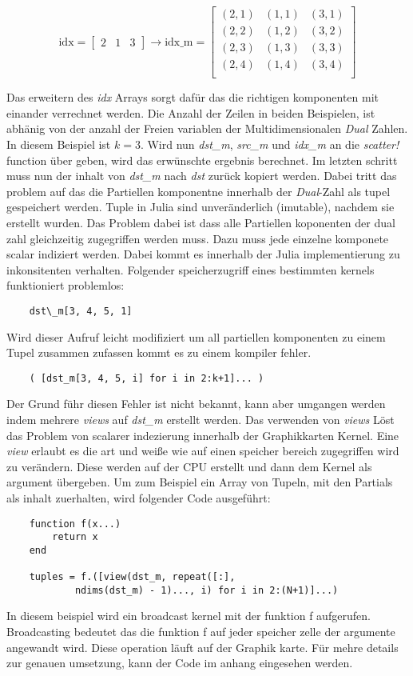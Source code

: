 \begin{equation}
\text{idx}= 
\begin{bmatrix}
 2 & 1 & 3
\end{bmatrix}
\rightarrow
\text{idx\_m} = 
\begin{bmatrix}
 (2, 1) & (1, 1) & (3, 1) \\ 
 (2, 2) & (1, 2) & (3, 2) \\
 (2, 3) & (1, 3) & (3, 3) \\
 (2, 4) & (1, 4) & (3, 4) \\
\end{bmatrix}
\end{equation}

Das erweitern des \textit{idx} Arrays sorgt dafür das die richtigen komponenten mit einander verrechnet werden.
Die Anzahl der Zeilen in beiden Beispielen, ist abhänig von der anzahl der Freien variablen  
der Multidimensionalen \textit{Dual} Zahlen. In diesem Beispiel ist $k = 3$.
Wird nun \textit{dst\_m}, \textit{src\_m} und \textit{idx\_m} an die \textit{scatter!} function über
geben, wird das erwünschte ergebnis berechnet. 
Im letzten schritt muss nun der inhalt von \textit{dst\_m} nach \textit{dst} zurück kopiert werden.
Dabei tritt das problem auf das die Partiellen komponentne innerhalb der \textit{Dual}-Zahl
als tupel gespeichert werden.
Tuple in Julia sind unveränderlich (imutable), nachdem sie erstellt wurden.
Das Problem dabei ist dass alle Partiellen koponenten der dual zahl gleichzeitig zugegriffen werden muss.
Dazu muss jede einzelne komponete scalar indiziert werden.
Dabei kommt es innerhalb der Julia implementierung zu inkonsitenten verhalten.
Folgender speicherzugriff eines bestimmten kernels funktioniert problemlos:
\begin{verbatim}
    dst\_m[3, 4, 5, 1]
\end{verbatim}
Wird dieser Aufruf leicht modifiziert um all partiellen komponenten zu einem Tupel zusammen zufassen 
kommt es zu einem kompiler fehler.
\begin{verbatim}
    ( [dst_m[3, 4, 5, i] for i in 2:k+1]... )
\end{verbatim}
Der Grund führ diesen Fehler ist nicht bekannt, kann aber umgangen werden indem mehrere \textit{views} auf
\textit{dst\_m} erstellt werden.
Das verwenden von \textit{views} Löst das Problem von scalarer indezierung innerhalb der Graphikkarten Kernel. 
Eine \textit{view} erlaubt es die art und weiße wie auf einen speicher bereich zugegriffen wird zu verändern.
Diese werden auf der CPU erstellt und dann dem Kernel als argument übergeben.
Um zum Beispiel ein Array von Tupeln, mit den Partials als inhalt zuerhalten, wird folgender Code ausgeführt:

\begin{verbatim}
	function f(x...)
		return x
	end
	
	tuples = f.([view(dst_m, repeat([:], 
	        ndims(dst_m) - 1)..., i) for i in 2:(N+1)]...)
\end{verbatim}

In diesem beispiel wird ein broadcast kernel mit der funktion f aufgerufen.
Broadcasting bedeutet das die funktion f auf jeder speicher zelle der argumente angewandt wird.
Diese operation läuft auf der Graphik karte.
Für mehre details zur genauen umsetzung, kann der Code im anhang eingesehen werden.
